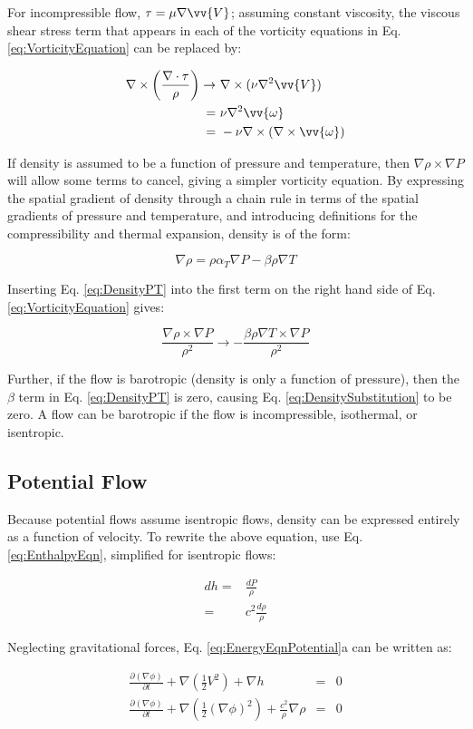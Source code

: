 \documentclass[10pt]{article}
\newcommand{\beq}{\begin{equation}}
\newcommand{\eeq}{\end{equation}}
\newcommand{\beqa}{\begin{equation}\begin{aligned}}
\newcommand{\eeqa}{\end{aligned}\end{equation}}
\begin{document}
\begin{flushleft}
For incompressible flow, \(\tau=\mu\nabla\vv{V}\); assuming constant viscosity, the viscous shear stress term that appears in each of the vorticity equations in Eq. \eqref{eq:VorticityEquation} can be replaced by:

\beqa
\label{eq:ViscousReplacement}
\nabla\times\left(\frac{\nabla\cdot\tau}{\rho}\right)\rightarrow&\ \nabla\times(\nu\nabla^2\vv{V})\\
=&\ \nu\nabla^2\vv{\omega}\\
=&\ -\nu\nabla\times(\nabla\times\vv{\omega})
\eeqa

If density is assumed to be a function of pressure and temperature, then \(\nabla\rho\times\nabla P\) will allow some terms to cancel, giving a simpler vorticity equation. By expressing the spatial gradient of density through a chain rule in terms of the spatial gradients of pressure and temperature, and introducing definitions for the compressibility and thermal expansion, density is of the form:

\beq
\label{eq:DensityPT}
\nabla\rho=\rho\alpha_T\nabla P-\beta\rho\nabla T
\eeq

Inserting Eq. \eqref{eq:DensityPT} into the first term on the right hand side of Eq. \eqref{eq:VorticityEquation} gives:

\beq
\label{eq:DensitySubstitution}
\frac{\nabla\rho\times\nabla P}{\rho^2}\rightarrow -\frac{\beta\rho\nabla T\times\nabla P}{\rho^2}
\eeq

Further, if the flow is barotropic (density is only a function of pressure), then the \(\beta\) term in Eq. \eqref{eq:DensityPT} is zero, causing Eq. \eqref{eq:DensitySubstitution} to be zero. A flow can be barotropic if the flow is incompressible, isothermal, or isentropic. 

\subsection{Potential Flow}
Because potential flows assume isentropic flows, density can be expressed entirely as a function of velocity. To rewrite the above equation, use Eq. \eqref{eq:EnthalpyEqn}, simplified for isentropic flows:

\beqa
dh=&\frac{dP}{\rho}\\
=&c^2\frac{d\rho}{\rho}
\eeqa

Neglecting gravitational forces, Eq. \eqref{eq:EnergyEqnPotential}a can be written as:

\begin{subequations}
\label{eq:R1}
\begin{eqnarray}
\frac{\partial (\nabla\phi)}{\partial t}+\nabla \left(\frac{1}{2}V^2\right)+\nabla h&=&0\\
\frac{\partial (\nabla\phi)}{\partial t}+\nabla \left(\frac{1}{2}(\nabla\phi)^2\right)+\frac{c^2}{\rho}\nabla\rho&=&0
\end{eqnarray}
\end{subequations}


\end{flushleft}
\end{document}
